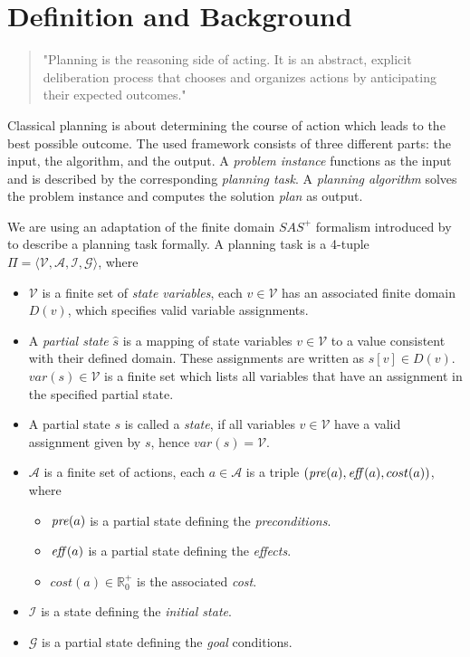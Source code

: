 \newpage
\section{Definition and Background}

\begin{quotation}
"Planning is the reasoning side of acting. It is an abstract, explicit
deliberation process that chooses and organizes actions by anticipating their
expected outcomes." ~\citep{ghallab2004}
\end{quotation}

Classical planning is about determining the course of action which leads to the best possible outcome. The used framework consists of three different parts: the input, the algorithm, and the output. A \emph{problem instance} functions as the input and is described by the corresponding \emph{planning task}. A \emph{planning algorithm} solves the problem instance and computes the solution \emph{plan} as output. 

\begin{bgDef}
We are using an adaptation of the finite domain $SAS^+$ formalism introduced by \cite{backstrom1995complexity} to describe a planning task formally. A planning task is a 4-tuple $\Pi = \langle \mathcal{V},\mathcal{A},\mathcal{I},\mathcal{G} \rangle$, where 
\begin{itemize}
    \item $\mathcal{V}$ is a finite set of \emph{state variables}, each $v \in \mathcal{V}$ has an associated finite domain $D(v)$, which specifies valid variable assignments.
    \item A \emph{partial state} $\hat{s}$ is a mapping of state variables $v \in \mathcal{V}$ to a value consistent with their defined domain. These assignments are written as $s[v] \in D(v)$. $var(s) \in \mathcal{V}$ is a finite set which lists all variables that have an assignment in the specified partial state. 
    \item A partial state $s$ is called a \emph{state}, if all variables $v \in \mathcal{V}$ have a valid assignment given by $s$, hence $var(s)=\mathcal{V}$.
    \item $\mathcal{A}$ is a finite set of actions, each $a \in \mathcal{A}$ is a triple $(\operatorname{\mathit{pre}}(a),\operatorname{\mathit{eff}}(a),cost(a))$, where
    \begin{itemize}
        \item $\operatorname{\mathit{pre}}(a)$ is a partial state defining the \emph{preconditions}.
        \item $\operatorname{\mathit{eff}}(a)$ is a partial state defining the \emph{effects}.
        \item $cost(a) \in \mathbb{R}_0^+$ is the associated \emph{cost}.
    \end{itemize}
    \item $\mathcal{I}$ is a state defining the \emph{initial state}.
    \item $\mathcal{G}$ is a partial state defining the \emph{goal} conditions.
\end{itemize}
\end{bgDef}

